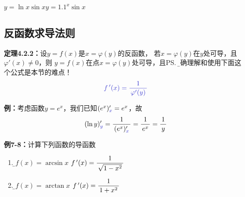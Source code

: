 \begin{center}
	\quad
	
	$y=\ln x\sin x$\hspace{5cm}$y=1.1^x\sin x$
\end{center}

\subsection{反函数求导法则}

{\bf 定理4.2.2：}设$y=f(x)$是$x=\varphi(y)$的反函数，
若$x=\varphi(y)$在$y$处可导，且$\varphi'(x)\ne 0$，则
$y=f(x)$在点$x=\varphi(y)$处可导，且\ps{\b 正确理解和使用下面这个公式是本节的难点！}
$${\b f\,'(x)=\df{1}{\varphi'(y)}}$$

{\bf 例：}考虑函数$y=e^x$，我们已知$(e^x)'_{\b x}=e^x$，故
$$(\ln y)'_{\b y}=\df1{(e^x)'_{\b x}}=\df1{e^x}=\df1y$$

{\bf 例7-8：}计算下列函数的导函数
\begin{enumerate}[(1)]
  \setlength{\itemindent}{1cm}
  \item {\b$f(x)=\arcsin x$ \hfill $f\,'(x)=\displaystyle\frac{\,{1}\,}{\,{\sqrt{1-x^2}}\,}$} 
  \item {\b$f(x)=\arctan x$ \hfill $f\,'(x)=\displaystyle\frac{\,{1}\,}{\,{1+x^2}\,}$}
\end{enumerate}

